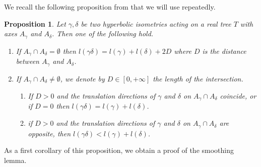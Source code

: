 \documentclass{amsart}
\newtheorem{proposition}{Proposition}
\begin{document}
We recall the following proposition from \cite{Conder-Paulin_Erratum-Gromov-R-trees_2020} that we will use repeatedly.
\begin{proposition}\label{Prop_Paulin}
Let $\gamma,\delta$ be two hyperbolic isometries acting on a real tree $T$ with axes $A_\gamma$ and $A_\delta$. Then one of the following hold.
\begin{enumerate}
    \item If $A_\gamma\cap A_\delta=\emptyset$ then $l(\gamma\delta)=l(\gamma)+l(\delta)+2D$ where $D$ is the distance between $A_\gamma$ and $A_\delta$. 
    \item If $A_\gamma\cap A_\delta\ne \emptyset$, we denote by $D\in [0,+\infty]$ the length of the intersection. 
    \begin{enumerate}
        \item[(i)] If $D>0$ and the translation directions of $\gamma$ and $\delta$ on $A_\gamma\cap A_\delta$ coincide, or if $D=0$ then $l(\gamma\delta)=l(\gamma)+l(\delta)$.
        \item[(ii)] if $D>0$ and the translation directions of $\gamma$ and $\delta$ on $A_\gamma\cap A_\delta$ are opposite, then $l(\gamma\delta)<l(\gamma)+l(\delta)$.
    \end{enumerate}
\end{enumerate}
\end{proposition}
As a first corollary of this proposition, we obtain a proof of the smoothing lemma. 
\end{document}
